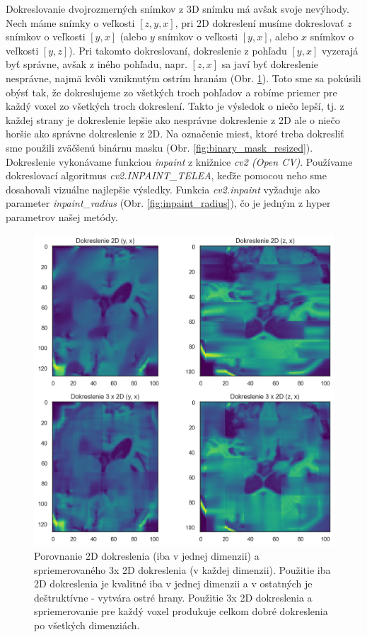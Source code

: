 Dokreslovanie dvojrozmerných snímkov z 3D snímku má avšak svoje nevýhody. Nech máme snímky o veľkosti $[z, y, x]$, pri 2D dokreslení musíme dokreslovať $z$ snímkov o veľkosti $[y, x]$ (alebo $y$ snímkov o veľkosti $[y, x]$, alebo $x$ snímkov o veľkosti $[y, z]$). Pri takomto dokreslovaní, dokreslenie z pohľadu $[y, x]$ vyzerajá byť správne, avšak z iného pohľadu, napr. $[z, x]$ sa javí byť dokreslenie nesprávne, najmä kvôli vzniknutým ostrím hranám (Obr. \ref{fig:inpaint_3x_2d}). Toto sme sa pokúsili obýsť tak, že dokreslujeme zo všetkých troch pohľadov a robíme priemer pre každý voxel zo všetkých troch dokreslení. Takto je výsledok o niečo lepší, tj. z každej strany je dokreslenie lepšie ako nesprávne dokreslenie z 2D ale o niečo horšie ako správne dokreslenie z 2D. Na označenie miest, ktoré treba dokresliť sme použili zväčšenú binárnu masku (Obr. \ref{fig:binary_mask_resized}). Dokreslenie vykonávame funkciou \textit{inpaint} z knižnice \textit{cv2 (Open CV)}. Používame dokreslovací algoritmus \textit{cv2.INPAINT\_TELEA}, keďže pomocou neho sme dosahovali vizuálne najlepšie výsledky. Funkcia \textit{cv2.inpaint} vyžaduje ako parameter \textit{inpaint\_radius} (Obr. \ref{fig:inpaint_radius}), čo je jedným z hyper parametrov našej metódy.

\begin{figure}[h!]
    \centering
    \includegraphics[width=13cm]{assets/images/inpaint_3x_2d.png}
    \caption{Porovnanie 2D dokreslenia (iba v jednej dimenzii) a spriemerovaného 3x 2D dokreslenia (v každej dimenzii). Použitie iba 2D dokreslenia je kvalitné iba v jednej dimenzii a v ostatných je deštruktívne - vytvára ostré hrany. Použitie 3x 2D dokreslenia a spriemerovanie pre každý voxel produkuje celkom dobré dokreslenia po všetkých dimenziách.}
    \label{fig:inpaint_3x_2d}
\end{figure}

